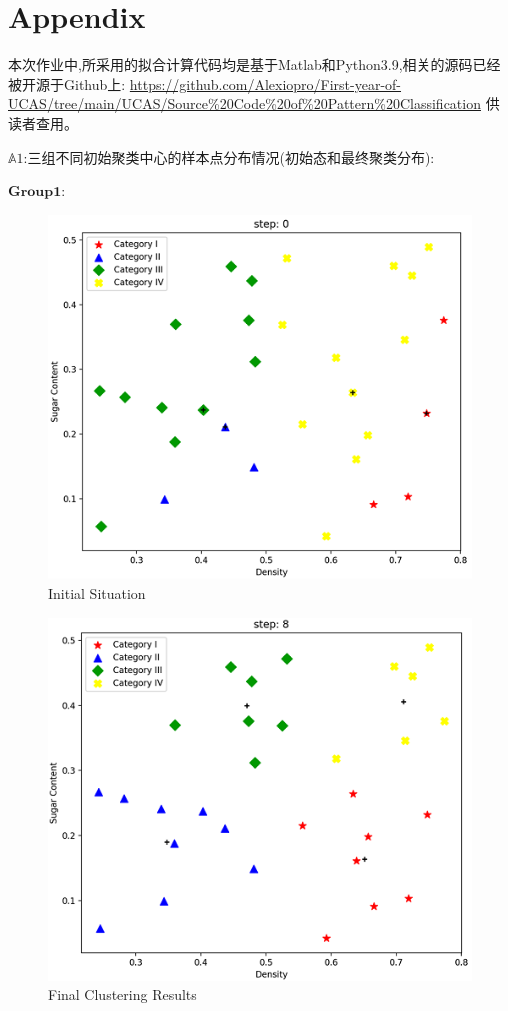 \documentclass[homework]{IEEEtran}
\begin{document}
\section{Appendix}
\begin{CJK}{UTF8}{gkai}
    本次作业中,所采用的拟合计算代码均是基于Matlab和Python3.9,相关的源码已经被开源于Github上:
    \url{https://github.com/Alexiopro/First-year-of-UCAS/tree/main/UCAS/Source%20Code%20of%20Pattern%20Classification}
    供读者查用。 \par
$\mathbb{A}1$:三组不同初始聚类中心的样本点分布情况(初始态和最终聚类分布): \par
$\mathbf{Group 1}$:
\begin{figure}[htb]
    \centerline{\includegraphics{Images/fig17.png}}
    \caption{Initial Situation}
    \label{fig17}
    \end{figure}

\begin{figure}[htb]
    \centerline{\includegraphics{Images/fig18.png}}
    \caption{Final Clustering Results}
    \label{fig18}
    \end{figure} \par
    \newpage


\end{CJK}
\end{document}
